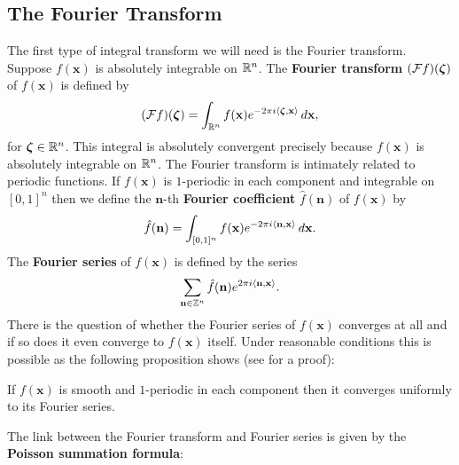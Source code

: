     \subsection*{The Fourier Transform}
      The first type of integral transform we will need is the Fourier transform. Suppose $f(\mathbf{x})$ is absolutely integrable on $\mathbb{R}^{n}$. The \textbf{Fourier transform} $(\mathcal{F}f)(\boldsymbol{\zeta})$ of $f(\mathbf{x})$ is defined by
      \[
        (\mathcal{F}f)(\boldsymbol{\zeta}) = \int_{\mathbb{R}^{n}}f(\mathbf{x})e^{-2\pi i\langle\boldsymbol{\zeta},\mathbf{x}\rangle}\,d\mathbf{x},
      \]
      for $\boldsymbol{\zeta} \in \mathbb{R}^{n}$. This integral is absolutely convergent precisely because $f(\mathbf{x})$ is absolutely integrable on $\mathbb{R}^{n}$. The Fourier transform is intimately related to periodic functions. If $f(\mathbf{x})$ is $1$-periodic in each component and integrable on $[0,1]^{n}$ then we define the $\mathbf{n}$-th \textbf{Fourier coefficient} $\hat{f}(\mathbf{n})$ of $f(\mathbf{x})$ by
      \[
        \hat{f}(\mathbf{n}) = \int_{[0,1]^{n}}f(\mathbf{x})e^{-2\pi i\langle\mathbf{n},\mathbf{x}\rangle}\,d\mathbf{x}.
      \]
      The \textbf{Fourier series} of $f(\mathbf{x})$ is defined by the series
      \[
        \sum_{\mathbf{n} \in \mathbb{Z}^{n}}\hat{f}(\mathbf{n})e^{2\pi i\langle\mathbf{n},\mathbf{x}\rangle}.
      \]
      There is the question of whether the Fourier series of $f(\mathbf{x})$ converges at all and if so does it even converge to $f(\mathbf{x})$ itself. Under reasonable conditions this is possible as the following proposition shows (see \cite{grafakos2008classical} for a proof):

      \begin{proposition}
        If $f(\mathbf{x})$ is smooth and $1$-periodic in each component then it converges uniformly to its Fourier series.
      \end{proposition}

      The link between the Fourier transform and Fourier series is given by the \textbf{Poisson summation formula}:

